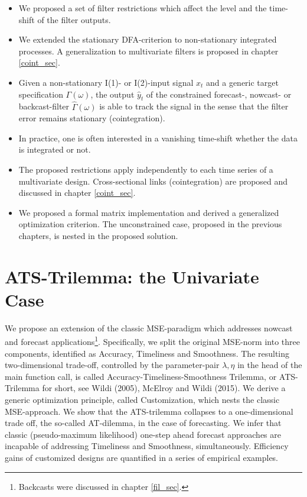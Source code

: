 \documentclass[a4paper]{book}
\begin{document}
\begin{itemize}
\item We proposed a set of  filter restrictions which affect the level and the time-shift of the filter outputs. 
\item We extended the stationary DFA-criterion to non-stationary integrated processes. A generalization to multivariate filters is proposed in chapter \ref{coint_sec}.
\item Given a non-stationary I(1)- or I(2)-input signal $x_t$ and a generic target specification $\Gamma(\omega)$, the output $\hat{y}_t$ of the constrained forecast-, nowcast- or backcast-filter $\hat{\Gamma}(\omega)$ is able to track the signal in the sense that the filter error remains stationary (cointegration). \item In practice, one is often interested in a vanishing time-shift whether the data is integrated or not.
\item The proposed restrictions apply independently to each time series of a multivariate design. Cross-sectional links (cointegration) are proposed and discussed in chapter \ref{coint_sec}.
\item We proposed a formal matrix implementation and derived a generalized optimization criterion. The unconstrained case, proposed in the previous chapters, is nested in the proposed solution.
\end{itemize}









\chapter{ATS-Trilemma: the Univariate Case}\label{ats_sec}

We propose an extension of the classic MSE-paradigm which addresses nowcast and forecast applications\footnote{Backcasts were discussed in chapter \ref{fil_sec}.}. Specifically, we split the original MSE-norm into three components, identified as Accuracy, Timeliness and Smoothness. The resulting two-dimensional trade-off, controlled by the parameter-pair $\lambda,\eta$ in the head of the main function call, is called Accuracy-Timeliness-Smoothness Trilemma, or ATS-Trilemma for short, see Wildi (2005), McElroy and Wildi (2015). We derive  a generic optimization principle, called Customization, which nests the classic MSE-approach.  We show that the ATS-trilemma collapses to a one-dimensional trade off, the so-called AT-dilemma, in the case of forecasting. We infer  that classic (pseudo-maximum likelihood)  one-step ahead forecast approaches are incapable of addressing Timeliness and Smoothness, simultaneously. Efficiency gains of customized designs are quantified in a series of empirical examples. \\
\end{document}
